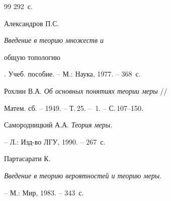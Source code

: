 \begin{thebibliography}{99}
292~с.





 Александров П.С. {\it Введение в теорию множеств и


общую топологию}. Учеб. пособие. -- М.: Наука, 1977. -- 368~с.





 Рохлин В.А. {\it Об основных понятиях теории меры} //


Матем. сб. -- 1949. -- Т.\,25. -- \No\,1. -- С.\,107--150.





 Самородницкий А.А. {\it Теория меры.}


-- Л.: Изд-во ЛГУ, 1990. -- 267~с.





 Партасарати К.


{\it Введение в теорию вероятностей и теорию меры.}


-- М.: Мир, 1983. -- 343~с.





\end{thebibliography}





\vskip 2cm


















